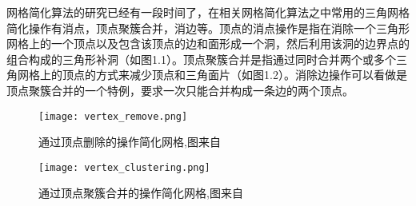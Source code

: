 网格简化算法的研究已经有一段时间了，在相关网格简化算法之中常用的三角网格简化操作有消点，顶点聚簇合并，消边等。顶点的消点操作是指在消除一个三角形网格上的一个顶点以及包含该顶点的边和面形成一个洞，然后利用该洞的边界点的组合构成的三角形补洞（如图1.1）。顶点聚簇合并是指通过同时合并两个或多个三角网格上的顶点的方式来减少顶点和三角面片（如图1.2）。消除边操作可以看做是顶点聚簇合并的一个特例，要求一次只能合并构成一条边的两个顶点。
\begin{figure}[htbp]
    \centering
    \texttt{[image: vertex\_remove.png]}
    \caption{通过顶点删除的操作简化网格,图来自\cite{mesh-simp}}
    \label{fig:顶点删除示意图}
\end{figure}
\begin{figure}[htbp]
    \centering
    \texttt{[image: vertex\_clustering.png]}
    \caption{通过顶点聚簇合并的操作简化网格,图来自\cite{mesh-simp}}
    \label{fig:顶点聚簇合并示意图}
\end{figure}

